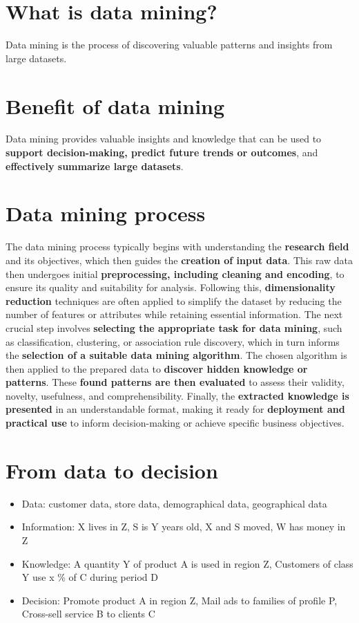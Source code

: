 \section{What is data mining?}
Data mining is the process of discovering valuable patterns and insights from large datasets.
\section{Benefit of data mining}
Data mining provides valuable insights and knowledge that can be used to \textbf{support decision-making, predict future trends or outcomes}, and \textbf{effectively summarize large datasets}.
\section{Data mining process}
The data mining process typically begins with understanding the \textbf{research field} and its objectives, which then guides the \textbf{creation of input data}. This raw data then undergoes initial \textbf{preprocessing, including cleaning and encoding}, to ensure its quality and suitability for analysis. Following this, \textbf{dimensionality reduction} techniques are often applied to simplify the dataset by reducing the number of features or attributes while retaining essential information. The next crucial step involves \textbf{selecting the appropriate task for data mining}, such as classification, clustering, or association rule discovery, which in turn informs the \textbf{selection of a suitable data mining algorithm}. The chosen algorithm is then applied to the prepared data to \textbf{discover hidden knowledge or patterns}. These \textbf{found patterns are then evaluated} to assess their validity, novelty, usefulness, and comprehensibility. Finally, the \textbf{extracted knowledge is presented} in an understandable format, making it ready for \textbf{deployment and practical use} to inform decision-making or achieve specific business objectives.
\section{From data to decision}
\begin{itemize}
\item Data: customer data, store data, demographical data, geographical data
\item Information: X lives in Z, S is Y years old, X and S moved, W has money in Z
\item Knowledge: A quantity Y of product A is used in region Z, Customers of class
      Y use x \% of C during period D
\item Decision: Promote product A in region Z, Mail ads to families of profile
      P, Cross-sell service B to clients C
\end{itemize}
